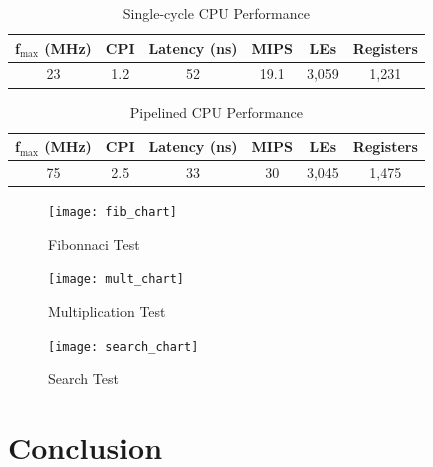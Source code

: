 \documentclass[12pt]{article}
\begin{document}
\begin{table}
\begin{center}

  \caption{Single-cycle CPU Performance}
  \begin{tabular}{| c | c | c | c | c | c |}
  \hline
  f$_{\textrm{max}}$ (MHz) & CPI & Latency (ns) & MIPS & LEs & Registers \\ \hline
 23 & 1.2 & 52 & 19.1 & 3,059 & 1,231 \\ \hline
  \end{tabular}
  \end{center}

  \label{tab:single}
\end{table}

\begin{table}
\begin{center}

  \caption{Pipelined CPU Performance}
  \begin{tabular}{| c | c | c | c | c | c |}
  \hline
  f$_{\textrm{max}}$ (MHz) & CPI & Latency (ns) & MIPS & LEs & Registers \\ \hline
  75 & 2.5 & 33 & 30 & 3,045 & 1,475 \\ \hline
  \end{tabular}
  \label{tab:pipe}
  \end{center}

\end{table}


\begin{figure}
	\begin{center}
		\texttt{[image: fib\_chart]}
	\end{center}
	\caption{Fibonnaci Test}
	\label{fig:fib_chart}
\end{figure}

\begin{figure}
	\begin{center}
		\texttt{[image: mult\_chart]}
	\end{center}
	\caption{Multiplication Test}
	\label{fig:mult_chart}
\end{figure}

\begin{figure}
	\begin{center}
		\texttt{[image: search\_chart]}
	\end{center}
	\caption{Search Test}
	\label{fig:search_chart}
\end{figure}

  \section{Conclusion}
\end{document}
